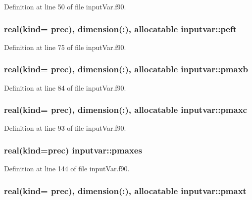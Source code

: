 Definition at line 50 of file input\-Var.\-f90.

\hypertarget{classinputvar_ab6d8921a6209783f0f51673c842f94b5}{
\subsubsection[{peft}]{\setlength{\rightskip}{0pt plus 5cm}real(kind= prec), dimension(\-:), allocatable inputvar\-::peft}}\label{classinputvar_ab6d8921a6209783f0f51673c842f94b5}


Definition at line 75 of file input\-Var.\-f90.

\hypertarget{classinputvar_a29e37a8460969d1438ed9aeb5d37d798}{
\subsubsection[{pmaxb}]{\setlength{\rightskip}{0pt plus 5cm}real(kind= prec), dimension(\-:), allocatable inputvar\-::pmaxb}}\label{classinputvar_a29e37a8460969d1438ed9aeb5d37d798}


Definition at line 84 of file input\-Var.\-f90.

\hypertarget{classinputvar_a93b555571bee30038d48c86de7ab5c14}{
\subsubsection[{pmaxc}]{\setlength{\rightskip}{0pt plus 5cm}real(kind= prec), dimension(\-:), allocatable inputvar\-::pmaxc}}\label{classinputvar_a93b555571bee30038d48c86de7ab5c14}


Definition at line 93 of file input\-Var.\-f90.

\hypertarget{classinputvar_a424224e3c5687c72c624fa212df200b4}{
\subsubsection[{pmaxes}]{\setlength{\rightskip}{0pt plus 5cm}real(kind=prec) inputvar\-::pmaxes}}\label{classinputvar_a424224e3c5687c72c624fa212df200b4}


Definition at line 144 of file input\-Var.\-f90.

\hypertarget{classinputvar_a0a9434332c855a12ef886b675af68d35}{
\subsubsection[{pmaxt}]{\setlength{\rightskip}{0pt plus 5cm}real(kind= prec), dimension(\-:), allocatable inputvar\-::pmaxt}}\label{classinputvar_a0a9434332c855a12ef886b675af68d35}


